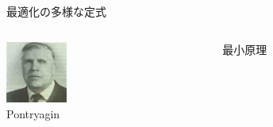 \documentclass[dvipdfmx,12pt]{beamer}
\begin{document}
\begin{frame}{最適化の多様な定式}
\begin{columns}
            \begin{column}{0.5\textwidth}
                \begin{boxnote}
                    \begin{columns}
                        \begin{column}{.5\textwidth}
                            \includegraphics[clip, width = 2.0cm]{Pontryagin.png}\\
                            {\tiny Pontryagin}
                            \centering
                        \end{column}
                        \begin{column}{.5\textwidth}
                            最小原理 \\
                        \end{column}
                    \end{columns}
                \end{boxnote}
            \end{column}
        \end{columns}

    \end{frame}
\end{document}
